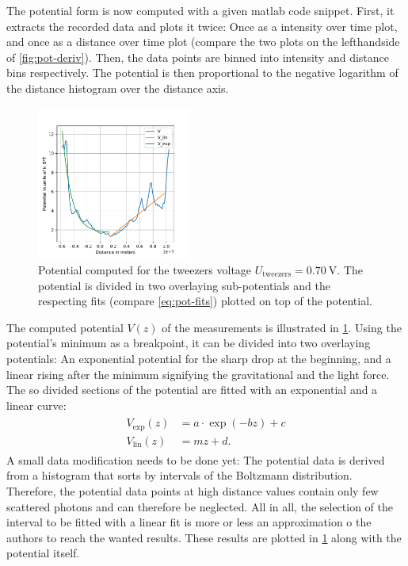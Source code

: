 \documentclass[../bericht.tex]{subfiles}
\begin{document}
      The potential form is now computed with a given matlab code snippet. First, it extracts the recorded data and plots it twice: Once as a intensity over time plot, and once as a distance over time plot (compare the two plots on the lefthandside of \cref{fig:pot-deriv}). Then, the data points are binned into intensity and distance bins respectively. The potential is then proportional to the negative logarithm of the distance histogram over the distance axis.

      \begin{figure}[tb]
        \centering
        \includegraphics[width=0.45\textwidth]{figures/70_potential.pdf}
        \caption[Potential computed for the tweezers voltage $U_\mathrm{tweezers}=\SI{0,70}{\volt}$.]{Potential computed for the tweezers voltage $U_\mathrm{tweezers}=\SI{0,70}{\volt}$. The potential is divided in two overlaying sub-potentials and the respecting fits (compare \cref{eq:pot-fits}) plotted on top of the potential.}
        \label{fig:potential-with-fits-70}
      \end{figure}

      The computed potential $V(z)$ of the measurements is illustrated in \cref{fig:potential-with-fits-70}. Using the potential's minimum as a breakpoint, it can be divided into two overlaying potentials: An exponential potential for the sharp drop at the beginning, and a linear rising after the minimum signifying the gravitational and the light force. The so divided sections of the potential are fitted with an exponential and a linear curve:
      \begin{align}
        \begin{split}
          V_\mathrm{exp}(z) &= a\cdot \exp\left( -b z \right) + c \\
          V_\mathrm{lin}(z) &= mz+ d.
        \end{split}
        \label{eq:pot-fits}
      \end{align}
      A small data modification needs to be done yet: The potential data is derived from a histogram that sorts by intervals of the Boltzmann distribution. Therefore, the potential data points at high distance values contain only few scattered photons and can therefore be neglected. All in all, the selection of the interval to be fitted with a linear fit is more or less an approximation o the authors to reach the wanted results. These results are plotted in \cref{fig:potential-with-fits-70} along with the potential itself.
\end{document}
